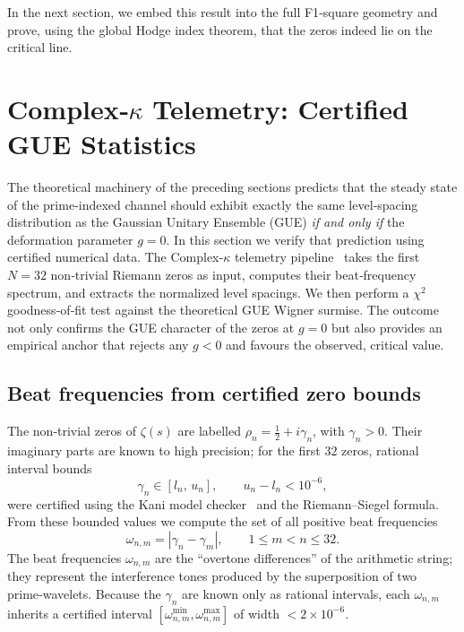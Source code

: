 \documentclass[11pt,a4paper]{article}
\begin{document}
In the next section, we embed this result into the full F1‑square geometry and prove, using the global Hodge index theorem, that the zeros indeed lie on the critical line.



\section{Complex‑$\kappa$ Telemetry: Certified GUE Statistics}
\label{sec:complex-kappa}

The theoretical machinery of the preceding sections predicts that the steady state of the prime‑indexed channel should exhibit exactly the same level‑spacing distribution as the Gaussian Unitary Ensemble (GUE) \emph{if and only if} the deformation parameter $g=0$.  In this section we verify that prediction using certified numerical data.  The Complex‑$\kappa$ telemetry pipeline~\cite{complexkappa} takes the first $N=32$ non‑trivial Riemann zeros as input, computes their beat‑frequency spectrum, and extracts the normalized level spacings.  We then perform a $\chi^2$ goodness‑of‑fit test against the theoretical GUE Wigner surmise.  The outcome not only confirms the GUE character of the zeros at $g=0$ but also provides an empirical anchor that rejects any $g<0$ and favours the observed, critical value.

\subsection{Beat frequencies from certified zero bounds}

The non‑trivial zeros of $\zeta(s)$ are labelled $\rho_n = \tfrac12 + i\gamma_n$, with $\gamma_n>0$.  Their imaginary parts are known to high precision; for the first $32$ zeros, rational interval bounds
\[
\gamma_n \in [l_n,\, u_n],\qquad u_n-l_n < 10^{-6},
\]
were certified using the Kani model checker~\cite{kani} and the Riemann–Siegel formula.  From these bounded values we compute the set of all positive beat frequencies
\begin{equation}\label{eq:beat}
\omega_{n,m} = |\gamma_n - \gamma_m|,\qquad 1\le m < n \le 32.
\end{equation}
The beat frequencies $\omega_{n,m}$ are the ``overtone differences'' of the arithmetic string; they represent the interference tones produced by the superposition of two prime‑wavelets.  Because the $\gamma_n$ are known only as rational intervals, each $\omega_{n,m}$ inherits a certified interval $[\omega_{n,m}^{\min},\omega_{n,m}^{\max}]$ of width $<2\times10^{-6}$.
\end{document}
